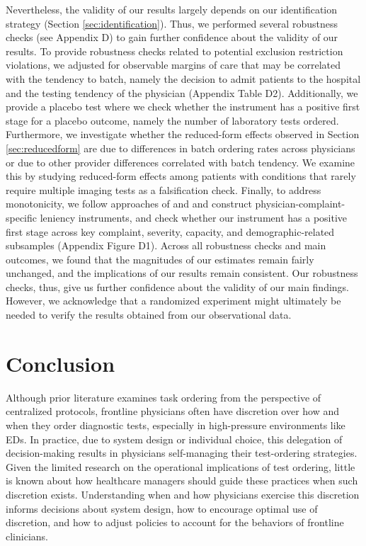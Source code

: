 \documentclass[,,nonblindrev]{informs}
\begin{document}
Nevertheless, the validity of our results largely depends on our
identification strategy (Section \ref{sec:identification}). Thus, we
performed several robustness checks (see Appendix D) to gain further
confidence about the validity of our results. To provide robustness
checks related to potential exclusion restriction violations, we
adjusted for observable margins of care that may be correlated with the
tendency to batch, namely the decision to admit patients to the hospital
and the testing tendency of the physician (Appendix Table D2).
Additionally, we provide a placebo test where we check whether the
instrument has a positive first stage for a placebo outcome, namely the
number of laboratory tests ordered. Furthermore, we investigate whether
the reduced-form effects observed in Section \ref{sec:reducedform} are
due to differences in batch ordering rates across physicians or due to
other provider differences correlated with batch tendency. We examine
this by studying reduced-form effects among patients with conditions
that rarely require multiple imaging tests as a falsification check.
Finally, to address monotonicity, we follow approaches of
\citet{dobbie2018effects} and \citet{bhuller2020incarceration} and
construct physician-complaint-specific leniency instruments, and check
whether our instrument has a positive first stage across key complaint,
severity, capacity, and demographic-related subsamples (Appendix Figure
D1). Across all robustness checks and main outcomes, we found that the
magnitudes of our estimates remain fairly unchanged, and the
implications of our results remain consistent. Our robustness checks,
thus, give us further confidence about the validity of our main
findings. However, we acknowledge that a randomized experiment might
ultimately be needed to verify the results obtained from our
observational data.

\section{Conclusion}\label{conclusion}

Although prior literature examines task ordering from the perspective of
centralized protocols, frontline physicians often have discretion over
how and when they order diagnostic tests, especially in high-pressure
environments like EDs. In practice, due to system design or individual
choice, this delegation of decision-making results in physicians
self-managing their test-ordering strategies. Given the limited research
on the operational implications of test ordering, little is known about
how healthcare managers should guide these practices when such
discretion exists. Understanding when and how physicians exercise this
discretion informs decisions about system design, how to encourage
optimal use of discretion, and how to adjust policies to account for the
behaviors of frontline clinicians.
\end{document}
